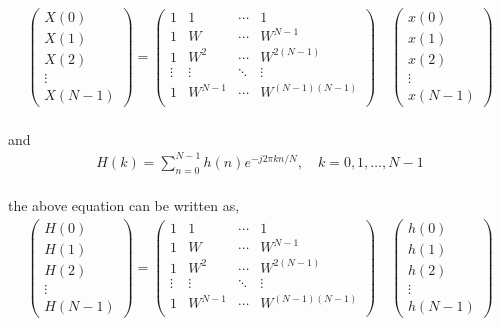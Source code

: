 \documentclass[journal,12pt,twocolumn]{IEEEtran}
\begin{document}
\begin{align}
\begin{pmatrix}
X(0)\\
X(1)\\
X(2)\\
\vdots\\
X(N-1)
\end{pmatrix}
= 
\begin{pmatrix}
1 & 1 & \cdots & 1 \\
1 & W  &  \cdots & W^{N-1} \\
1 & W^{2} &  \cdots & W^{2(N-1)} \\
\vdots  & \vdots  & \ddots & \vdots  \\
1 & W^{N-1}  &  \cdots & W^{(N-1)(N-1)} \\ 
\end{pmatrix}
\quad
\begin{pmatrix}
x(0)\\
x(1)\\
x(2)\\
\vdots\\
x(N-1)
\end{pmatrix}
\end{align}\\
and \\
\begin{align}
    H(k) = \sum_{n=0}^{N-1} h(n) e^{-j 2 \pi k n / N}, \quad k=0,1, \ldots, N-1
\end{align}\\
the above equation can be written as,
\begin{align}
\begin{pmatrix}
H(0)\\
H(1)\\
H(2)\\
\vdots\\
H(N-1)
\end{pmatrix}
= 
\begin{pmatrix}
1 & 1 & \cdots & 1 \\
1 & W  &  \cdots & W^{N-1} \\
1 & W^{2}  &  \cdots & W^{2(N-1)} \\
\vdots  & \vdots   & \ddots & \vdots  \\
1 & W^{N-1} &  \cdots & W^{(N-1)(N-1)} \\ 
\end{pmatrix}
\quad
\begin{pmatrix}
h(0)\\
h(1)\\
h(2)\\
\vdots\\
h(N-1)
\end{pmatrix}
\end{align}
\end{document}
